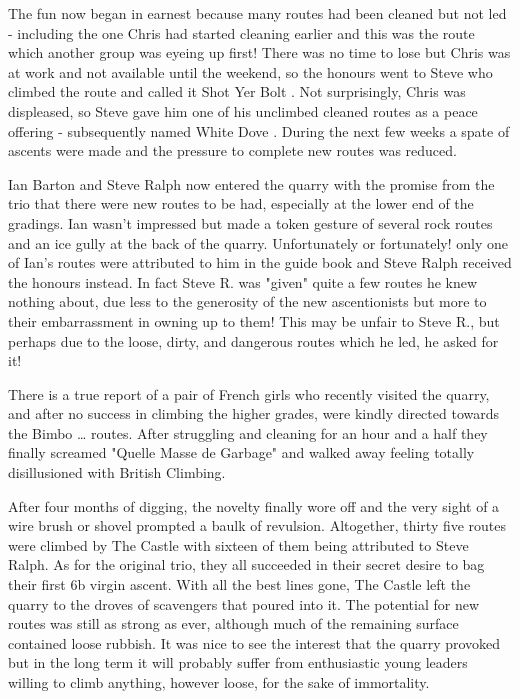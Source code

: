 \documentclass[a5paper,openany,font 10pt]{scrbook}
\begin{document}
The fun now began in earnest because many routes had been
cleaned but not led - including the one Chris had started
cleaning earlier and this was the route which another group was
eyeing up first! There was no time to lose but Chris was at work
and not available until the weekend, so the honours went to Steve
who climbed the route and called it   Shot Yer Bolt . Not
surprisingly, Chris was displeased, so Steve gave him one of his
unclimbed cleaned routes as a peace offering - subsequently named
 White Dove . During the next few weeks a spate of ascents were
made and the pressure to complete new routes was reduced.

Ian Barton and Steve Ralph now entered the quarry with the
promise from the trio that there were new routes to be had,
especially at the lower end of the gradings. Ian wasn't impressed
but made a token gesture of several rock routes and an ice gully
at the back of the quarry. Unfortunately  or fortunately!  only
one of Ian's routes were attributed to him in the guide book and
Steve Ralph received the honours instead.  In fact Steve R. was
"given" quite a few routes he knew nothing about, due less to the
generosity of the new ascentionists but more to their
embarrassment in owning up to them! This may be unfair to Steve
R., but perhaps due to the loose, dirty, and dangerous routes
which he led, he asked for it!

There is a true report of a pair of French girls who
recently visited the quarry, and after no success in climbing the
higher grades, were kindly directed towards the   Bimbo \ldots{}
routes. After struggling and cleaning for an hour and a half they
finally screamed "Quelle Masse de Garbage" and walked away
feeling totally disillusioned with British Climbing.

After four months of digging, the novelty finally wore off
and the very sight of a wire brush or shovel prompted a baulk of
revulsion. Altogether, thirty five routes were climbed by The
Castle with sixteen of them being attributed to Steve Ralph.  As
for the original trio, they all succeeded in their secret desire
to bag their first 6b virgin ascent. With all the best lines
gone, The Castle left the quarry to the droves of scavengers that
poured into it. The potential for new routes was still as strong
as ever, although much of the remaining surface contained loose
rubbish. It was nice to see the interest that the quarry provoked
but in the long term it will probably suffer from enthusiastic
young leaders willing to climb anything, however loose, for the
sake of immortality.
\end{document}
